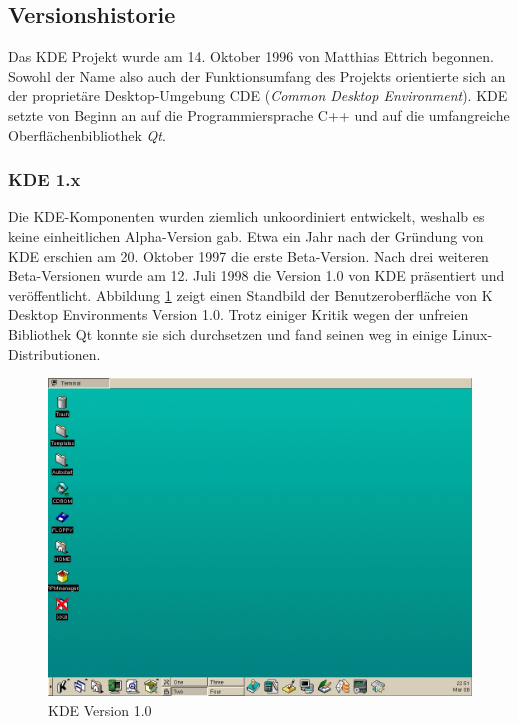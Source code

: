 \subsection{Versionshistorie}
Das KDE Projekt wurde am 14. Oktober 1996 von Matthias Ettrich begonnen. Sowohl der Name also auch der Funktionsumfang des Projekts orientierte sich an der proprietäre Desktop-Umgebung CDE (\textit{Common Desktop Environment}). KDE setzte von Beginn an auf die Programmiersprache C++ und auf die umfangreiche Oberflächenbibliothek \textit{Qt}.

\subsubsection{KDE 1.x}
Die KDE-Komponenten wurden ziemlich unkoordiniert entwickelt, weshalb es keine einheitlichen Alpha-Version gab. Etwa ein Jahr nach der Gründung von KDE erschien am 20. Oktober 1997 die erste Beta-Version. Nach drei weiteren Beta-Versionen wurde am 12. Juli 1998 die Version 1.0 von KDE präsentiert und veröffentlicht. Abbildung \ref{fig:kdeversion1} zeigt einen Standbild der Benutzeroberfläche von K Desktop Environments Version 1.0. Trotz einiger Kritik wegen der unfreien Bibliothek Qt konnte sie sich durchsetzen und fand seinen weg in einige Linux-Distributionen. \cite{kdeversion1}

\begin{figure}[h]
	\centering
	\includegraphics[width=\linewidth]{images/KDE_1.png}
	\caption{KDE Version 1.0 \cite{kdeversionenwiki}}
	\label{fig:kdeversion1}
\end{figure}

